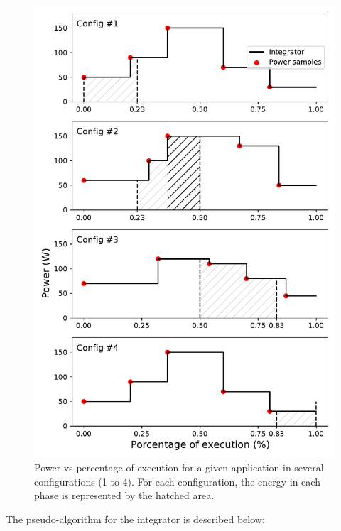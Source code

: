 \begin{figure}[H]
	\centering
	\includegraphics[width=\columnwidth]{phases/figures/integrator.pdf}
	\caption{Power vs percentage of execution for a given application in several configurations (1 to 4). For each configuration, the energy in each phase is represented by the hatched area.}
	\label{fig:zero_order}
\end{figure}

The pseudo-algorithm for the integrator is described below:

